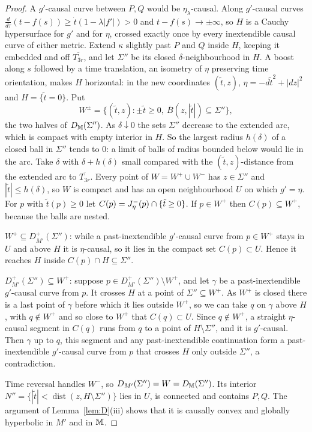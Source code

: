\begin{proof}
A $g'$-causal curve between $P,Q$ would be $\eta_\lambda$-causal. Along
$g'$-causal curves $\tfrac{d}{d\tau}(t-f(s))\ge\dot t(1-\lambda|f'|)>0$ and
$t-f(s)\to\pm\infty$, so $H$ is a Cauchy hypersurface for $g'$ and for $\eta$,
crossed exactly once by every inextendible causal curve of either metric.
Extend $\kappa$ slightly past $P$ and $Q$ inside $H$, keeping it embedded and off $\overline{T_{3r}}$, and let $\Sigma''$ be its closed
$\delta$-neighbourhood in $H$. A boost along $s$ followed by a time translation, an isometry of $\eta$ preserving time orientation, makes $H$ horizontal: in the new coordinates $(\tilde t,z)$, $\eta=-d\tilde t^2+|dz|^2$ and
$H=\{\tilde t=0\}$. Put
\[
W^\pm=\{(\tilde t,z):\pm\tilde t\ge0,\ \overline B(z,|\tilde t|)\subseteq\Sigma''\},
\]
the two halves of $D_\mathbb M(\Sigma'')$. As $\delta\downarrow0$ the sets $\Sigma''$ decrease to the extended arc, which is compact with empty interior in $H$. So the largest radius $h(\delta)$ of a closed ball in $\Sigma''$ tends to $0$: a limit of balls of radius bounded below would lie in the arc. Take $\delta$ with $\delta+h(\delta)$ small compared with the $(\tilde t,z)$-distance from the extended arc to $\overline{T_{3r}}$. Every point of $W=W^+\cup W^-$ has $z\in\Sigma''$ and $|\tilde t|\le h(\delta)$, so $W$ is compact and has an open neighbourhood $U$ on which $g'=\eta$.
For $p$ with $\tilde t(p)\ge0$ let $C(p)=J^{-}_\eta(p)\cap\{\tilde t\ge0\}$. If $p\in
W^+$ then $C(p)\subseteq W^+$, because the balls are nested.

$W^+\subseteq D^+_{M'}(\Sigma'')$: while a past-inextendible $g'$-causal curve from
$p\in W^+$ stays in $U$ and above $H$ it is $\eta$-causal, so it lies in the
compact set $C(p)\subset U$. Hence it reaches $H$ inside $C(p)\cap H\subseteq\Sigma''$.

$D^+_{M'}(\Sigma'')\subseteq W^+$: suppose $p\in D^+_{M'}(\Sigma'')\setminus W^+$, and let
$\gamma$ be a past-inextendible $g'$-causal curve from $p$. It crosses $H$ at a
point of $\Sigma''\subseteq W^+$. As $W^+$ is closed there is a last point of $\gamma$
before which it lies outside $W^+$, so we can take $q$ on $\gamma$ above $H$, with
$q\notin W^+$ and so close to $W^+$ that $C(q)\subset U$. Since $q\notin W^+$, a
straight $\eta$-causal segment in $C(q)$ runs from $q$ to a point of
$H\setminus\Sigma''$, and it is $g'$-causal. Then $\gamma$ up to $q$, this segment
and any past-inextendible continuation form a past-inextendible $g'$-causal curve
from $p$ that crosses $H$ only outside $\Sigma''$, a contradiction.

Time reversal handles $W^-$, so $D_{M'}(\Sigma'')=W=D_\mathbb M(\Sigma'')$. Its interior
$N''=\{|\tilde t|<\operatorname{dist}(z,H\setminus\Sigma'')\}$ lies in $U$, is connected
and contains $P,Q$. The argument of Lemma~\ref{lem:D}(iii) shows that it is causally
convex and globally hyperbolic in $M'$ and in $\mathbb M$.
\end{proof}

